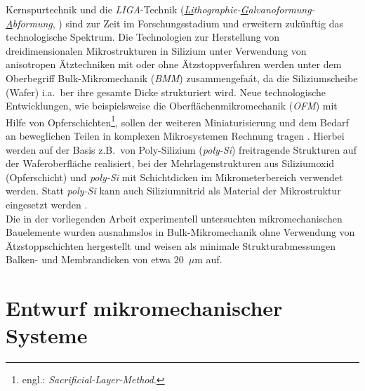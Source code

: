Kernspurtechnik \cite{Spo90} und die {\em LIGA}-Technik
({\em \underline{Li}thographie-\underline{G}alvanoformung-\underline{A}bformung},
\cite{Bec86}) sind zur Zeit im
Forschungsstadium und erweitern zukünftig das technologische Spektrum.
Die Technologien zur Herstellung von dreidimensionalen Mikrostrukturen in
Silizium unter Verwendung von anisotropen Ätztechniken mit oder ohne
Ätzstoppverfahren
werden unter dem Oberbegriff Bulk-Mikromechanik ({\em BMM}) zusammengefaát,
da die Siliziumscheibe (Wafer) i.a.\ ber ihre gesamte Dicke strukturiert
wird. Neue technologische Entwicklungen, wie beispielsweise die
Oberflächenmikromechanik ({\em OFM}) mit Hilfe von
Opferschichten\footnote{engl.: {\em Sacrificial-Layer-Method}.},
sollen der weiteren Miniaturisierung und
dem Bedarf an beweglichen Teilen in komplexen Mikrosystemen Rechnung
tragen \cite{How87, Fan87}. Hierbei werden auf der Basis z.B.\
von Poly-Silizium ({\em poly-Si})
freitragende Strukturen auf der Waferoberfläche realisiert, bei der
Mehrlagenstrukturen aus Siliziumoxid (Opferschicht) und {\em poly-Si} mit
Schichtdicken im Mikrometerbereich verwendet werden. Statt {\em poly-Si}
kann auch Siliziumnitrid als Material der Mikrostruktur eingesetzt
werden \cite{Smi92a}.\\
%
Die in der vorliegenden Arbeit experimentell untersuchten mikromechanischen
Bauelemente wurden ausnahmslos in Bulk-Mikromechanik ohne
Verwendung von Ätzstoppschichten hergestellt und weisen als minimale
Strukturabmessungen Balken- und Membrandicken von etwa 20~$\mu$m auf.


\section{Entwurf mikromechanischer Systeme}
\label{entwurf}

